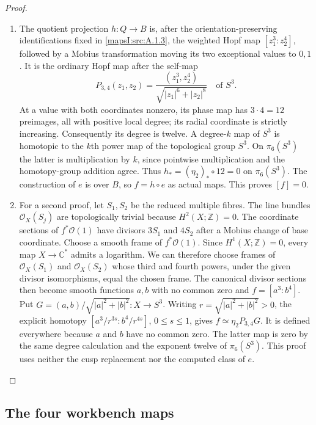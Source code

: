 \begin{proof}
\begin{enumerate}[label=\arabic*.,leftmargin=*]
\item The quotient projection $h:Q\to B$ is, after the
orientation-preserving identifications fixed in \cref{mapsI:src:A.1.3},
the weighted Hopf map
$[z_1^3:z_2^4]$, followed by a Mobius transformation
moving its two exceptional values to $0,1$.
It is the ordinary Hopf map after the self-map
\[
 P_{3,4}(z_1,z_2)=
 \frac{(z_1^3,z_2^4)}{\sqrt{|z_1|^6+|z_2|^8}}
 \quad\text{of }S^3.
 \tag{B.2.1}\label{maps:eq:B.2.1}
\]
At a value with both coordinates nonzero, its phase
map has $3\cdot4=12$ preimages, all with positive local
degree; its radial coordinate is strictly increasing.
Consequently its degree is twelve.  A degree-$k$ map
of $S^3$ is homotopic to the $k$th power map of the
topological group $S^3$.  On $\pi_6(S^3)$ the latter
is multiplication by $k$, since pointwise multiplication
and the homotopy-group addition agree.  Thus
$h_* = (\eta_2)_*\circ12=0$ on $\pi_6(S^3)$.
The construction of $e$ is over $B$, so $f=h\circ e$
as actual maps.  This proves $[f]=0$.

\item For a second proof, let $S_1,S_2$ be the reduced multiple
fibres.  The line bundles $\mathcal O_X(S_j)$ are
topologically trivial because $H^2(X;\mathbb Z)=0$.
The coordinate sections of $f^*\mathcal O(1)$ have
divisors $3S_1$ and $4S_2$ after a Mobius change of
base coordinate.  Choose a smooth frame of
$f^*\mathcal O(1)$.  Since $H^1(X;\mathbb Z)=0$, every
map $X\to\mathbb C^*$ admits a logarithm.  We can
therefore choose frames of $\mathcal O_X(S_1)$ and
$\mathcal O_X(S_2)$ whose third and fourth powers,
under the given divisor isomorphisms, equal the chosen
frame.  The canonical divisor sections then become
smooth functions $a,b$ with no common zero and
$f=[a^3:b^4]$.  Put
$G=(a,b)/\sqrt{|a|^2+|b|^2}:X\to S^3$.
Writing $r=\sqrt{|a|^2+|b|^2}>0$, the explicit homotopy
$[a^3/r^{3s}:b^4/r^{4s}]$, $0\leq s\leq1$, gives
$f\simeq\eta_2P_{3,4}G$.  It is defined everywhere because
$a$ and $b$ have no common zero.  The latter map is zero
by the same degree calculation and the exponent twelve
of $\pi_6(S^3)$.  This proof uses neither the cusp
replacement nor the computed class of $e$.
\end{enumerate}
\end{proof}

\subsection{The four workbench maps}

